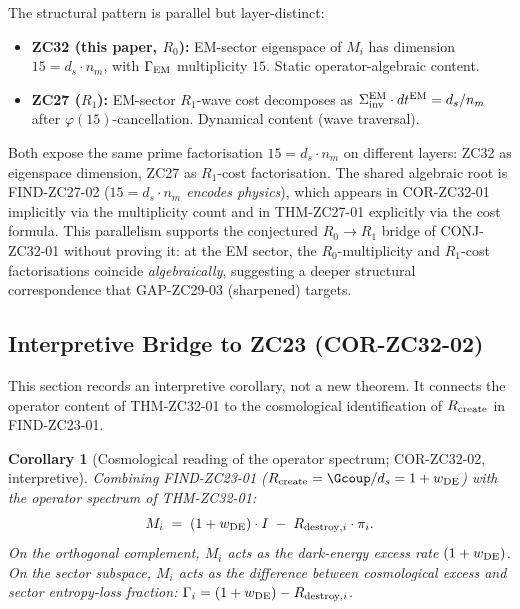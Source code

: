 \documentclass[12pt, a4paper]{article}
\newtheorem{corollary}{Corollary}[section]
\begin{document}
The structural pattern is parallel but layer-distinct:
\begin{itemize}[leftmargin=*, noitemsep]
  \item \textbf{ZC32 (this paper, $R_0$):} EM-sector
    eigenspace of $M_i$ has dimension $15 = d_s \cdot n_m$,
    with $\Gamma_{\rm EM}$ multiplicity $15$. Static
    operator-algebraic content.
  \item \textbf{ZC27 ($R_1$):} EM-sector $R_1$-wave cost
    decomposes as $\Sigma_{\rm inv}^{\rm EM} \cdot dt^{\rm EM}
    = d_s/n_m$ after $\varphi(15)$-cancellation. Dynamical
    content (wave traversal).
\end{itemize}
Both expose the same prime factorisation $15 = d_s \cdot n_m$
on different layers: ZC32 as eigenspace dimension, ZC27 as
$R_1$-cost factorisation. The shared algebraic root is
FIND-ZC27-02 (\textsl{$15 = d_s \cdot n_m$ encodes physics}),
which appears in COR-ZC32-01 implicitly via the multiplicity
count and in THM-ZC27-01 explicitly via the cost formula.
This parallelism supports the conjectured $R_0 \to R_1$
bridge of CONJ-ZC32-01 without proving it: at the EM sector,
the $R_0$-multiplicity and $R_1$-cost factorisations coincide
\emph{algebraically}, suggesting a deeper structural
correspondence that GAP-ZC29-03 (sharpened) targets.

\subsection{Interpretive Bridge to ZC23 (COR-ZC32-02)}
\label{sec:cor-zc32-02}

This section records an interpretive corollary, not a new
theorem. It connects the operator content of THM-ZC32-01 to
the cosmological identification of $R_{\rm create}$ in
FIND-ZC23-01.

\begin{corollary}[Cosmological reading of the operator
  spectrum; COR-ZC32-02, interpretive]
\label{cor:zc32-02}
Combining FIND-ZC23-01 ($R_{\rm create} = \Gcoup/d_s
= 1 + w_{\rm DE}$) with the operator spectrum of
THM-ZC32-01:
\[
  M_i
    \;=\; (1 + w_{\rm DE})\cdot I
          \;-\; R_{{\rm destroy},i}\cdot \pi_i.
\]
On the orthogonal complement, $M_i$ acts as the dark-energy
excess rate $(1 + w_{\rm DE})$. On the sector subspace,
$M_i$ acts as the difference between cosmological excess
and sector entropy-loss fraction:
$\Gamma_i = (1+w_{\rm DE}) - R_{{\rm destroy},i}$.
\end{corollary}
\end{document}
